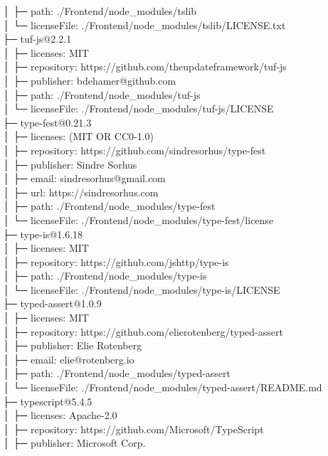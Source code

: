 │  ├─ path: ./Frontend/node\_modules/tslib\\
│  └─ licenseFile: ./Frontend/node\_modules/tslib/LICENSE.txt\\
├─ tuf-js@2.2.1\\
│  ├─ licenses: MIT\\
│  ├─ repository: https://github.com/theupdateframework/tuf-js\\
│  ├─ publisher: bdehamer@github.com\\
│  ├─ path: ./Frontend/node\_modules/tuf-js\\
│  └─ licenseFile: ./Frontend/node\_modules/tuf-js/LICENSE\\
├─ type-fest@0.21.3\\
│  ├─ licenses: (MIT OR CC0-1.0)\\
│  ├─ repository: https://github.com/sindresorhus/type-fest\\
│  ├─ publisher: Sindre Sorhus\\
│  ├─ email: sindresorhus@gmail.com\\
│  ├─ url: https://sindresorhus.com\\
│  ├─ path: ./Frontend/node\_modules/type-fest\\
│  └─ licenseFile: ./Frontend/node\_modules/type-fest/license\\
├─ type-is@1.6.18\\
│  ├─ licenses: MIT\\
│  ├─ repository: https://github.com/jshttp/type-is\\
│  ├─ path: ./Frontend/node\_modules/type-is\\
│  └─ licenseFile: ./Frontend/node\_modules/type-is/LICENSE\\
├─ typed-assert@1.0.9\\
│  ├─ licenses: MIT\\
│  ├─ repository: https://github.com/elierotenberg/typed-assert\\
│  ├─ publisher: Elie Rotenberg\\
│  ├─ email: elie@rotenberg.io\\
│  ├─ path: ./Frontend/node\_modules/typed-assert\\
│  └─ licenseFile: ./Frontend/node\_modules/typed-assert/README.md\\
├─ typescript@5.4.5\\
│  ├─ licenses: Apache-2.0\\
│  ├─ repository: https://github.com/Microsoft/TypeScript\\
│  ├─ publisher: Microsoft Corp.\\

